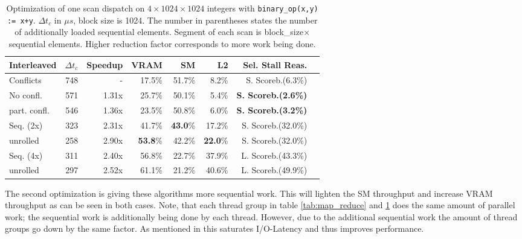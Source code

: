 \documentclass[m,times]{cgMA}
\begin{document}
\begin{table}[htpb]
  \begin{tabular}{ | l | r | r | r | r | r | r | r |}    \hline
    Interleaved       &  $\Delta t_c$         & Speedup &VRAM              & SM      & L2     & Sel. Stall Reas.\\\hline
    Conflicts           & 748                   & -       &17.5\%            & 51.7\%  & 8.2\%  & S. Scoreb.(6.3\%)\\\hline
    No confl.           & 571                   & 1.31x   &25.7\%            & 50.1\%  & 5.4\%  & \textbf{S. Scoreb.(2.6\%)}\\\hline
    part. confl.        & 546                   & 1.36x   &23.5\%            & 50.8\%  & 6.0\%  & \textbf{S. Scoreb.(3.2\%)} \\\hline\hline
    Seq. (2x)           & 323                   & 2.31x   &41.7\%            & \textbf{43.0}\%  & 17.2\% & S. Scoreb.(32.0\%)\\\hline
    unrolled            & 258                   & 2.90x   &\textbf{53.8}\%   & 42.2\%  & \textbf{22.0}\% & S. Scoreb.(32.0\%)\\\hline\hline
    Seq. (4x)           & 311                   & 2.40x   &56.8\%            & 22.7\%  & 37.9\% & L. Scoreb.(43.3\%)\\\hline
    unrolled            & 297                   & 2.52x   &61.1\%            & 21.2\%  & 40.6\% & L. Scoreb.(49.9\%)\\
    \hline
  \end{tabular}
  \caption{Optimization of one scan dispatch on $4 \times 1024\times1024$ integers with \texttt{binary\_op(x,y) := x+y}. $\Delta t_c$ in $\mu s$, block size is 1024. The number in parentheses states the number of additionally loaded sequential elements. Segment of each scan is block\_size$\times$ sequential elements. Higher reduction factor corresponds to more work being done.}\label{tab:scan}
\end{table}
The second optimization is giving these algorithms more sequential work. This will lighten the SM throughput and increase VRAM throughput as can be seen in both cases. Note, that each thread group in table \ref{tab:map_reduce} and \ref{tab:scan} does the same amount of parallel work; the sequential work is additionally being done by each thread. However, due to the additional sequential work the amount of thread groups go down by the same factor. As mentioned in \cite{NVIDIA:PARALLEL_REDUCTION} this saturates I/O-Latency and thus improves performance.
\end{document}
